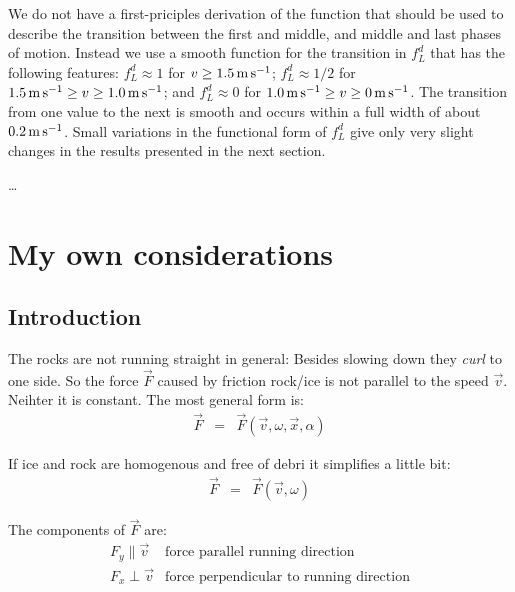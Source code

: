 {\begin{flowtext}{2}
We do not have a first-priciples derivation of the function that should be used
to describe the transition between the first and middle, and middle and last
phases of motion. Instead we use a smooth function for the transition in
$f_L^d$ that has the following features:
$f_L^d \approx 1  $ for $v \ge 1.5 \meter\second^{-1}$;
$f_L^d \approx 1/2$ for $1.5 \meter\second^{-1} \ge v \ge 1.0 \meter\second^{-1}$; and
$f_L^d \approx 0  $ for $1.0 \meter\second^{-1} \ge v \ge 0 \meter\second^{-1}$.
The transition from one value to the next is smooth and occurs within a full
width of about $0.2 \meter\second^{-1}$. Small variations in the functional
form of $f_L^d$ give only very slight changes in the results presented in the
next section.

\end{flowtext}
}

\dots

\clearpage
\section{My own considerations}

\subsection{Introduction}

The rocks are not running straight in general: Besides slowing down they
\emph{curl} to one side. So the force $ \vec{F} $ caused by friction
rock/ice is not parallel to the speed $ \vec{v}
$. Neihter it is constant. The most general form is:
\begin{eqnarray}
    \vec{ F } &=& \vec{ F }( \vec{v}, \omega, \vec{x}, \alpha )
\end{eqnarray}

If ice and rock are homogenous and free of debri it simplifies a little
bit:
\begin{eqnarray}
    \vec{ F } &=& \vec{ F }( \vec{v}, \omega )
\end{eqnarray}

The components of $ \vec{ F } $ are:
\begin{equation}
\begin{array}{ll}
F_y \parallel \vec{v} & \textrm{force parallel running direction} \\
F_x \perp     \vec{v} & \textrm{force perpendicular to running direction}
\end{array}
\end{equation}

